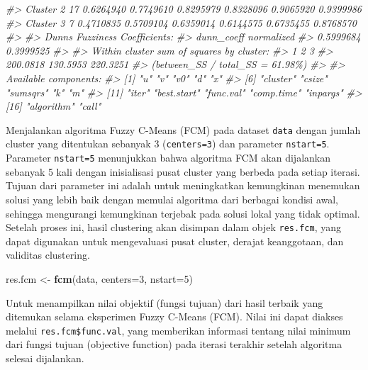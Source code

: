 \documentclass[
  oneside]{book}
\newenvironment{Shaded}{\begin{snugshade}}{\end{snugshade}}
\newcommand{\AttributeTok}[1]{\textcolor[rgb]{0.13,0.29,0.53}{#1}}
\newcommand{\CommentTok}[1]{\textcolor[rgb]{0.56,0.35,0.01}{\textit{#1}}}
\newcommand{\DecValTok}[1]{\textcolor[rgb]{0.00,0.00,0.81}{#1}}
\newcommand{\FunctionTok}[1]{\textcolor[rgb]{0.13,0.29,0.53}{\textbf{#1}}}
\newcommand{\NormalTok}[1]{#1}
\newcommand{\OtherTok}[1]{\textcolor[rgb]{0.56,0.35,0.01}{#1}}
\begin{document}
\begin{Shaded}
\begin{Highlighting}[]
\CommentTok{\#\textgreater{} Cluster 2   17 0.6264940 0.7749610 0.8295979 0.8328096 0.9065920 0.9399986}
\CommentTok{\#\textgreater{} Cluster 3    7 0.4710835 0.5709104 0.6359014 0.6144575 0.6735455 0.8768570}
\CommentTok{\#\textgreater{} }
\CommentTok{\#\textgreater{} Dunn\textquotesingle{}s Fuzziness Coefficients:}
\CommentTok{\#\textgreater{} dunn\_coeff normalized }
\CommentTok{\#\textgreater{}  0.5999684  0.3999525 }
\CommentTok{\#\textgreater{} }
\CommentTok{\#\textgreater{} Within cluster sum of squares by cluster:}
\CommentTok{\#\textgreater{}        1        2        3 }
\CommentTok{\#\textgreater{} 200.0818 130.5953 220.3251 }
\CommentTok{\#\textgreater{} (between\_SS / total\_SS =  61.98\%) }
\CommentTok{\#\textgreater{} }
\CommentTok{\#\textgreater{} Available components: }
\CommentTok{\#\textgreater{}  [1] "u"          "v"          "v0"         "d"          "x"         }
\CommentTok{\#\textgreater{}  [6] "cluster"    "csize"      "sumsqrs"    "k"          "m"         }
\CommentTok{\#\textgreater{} [11] "iter"       "best.start" "func.val"   "comp.time"  "inpargs"   }
\CommentTok{\#\textgreater{} [16] "algorithm"  "call"}
\end{Highlighting}
\end{Shaded}

Menjalankan algoritma Fuzzy C-Means (FCM) pada dataset \texttt{data} dengan jumlah cluster yang ditentukan sebanyak 3 (\texttt{centers=3}) dan parameter \texttt{nstart=5}. Parameter \texttt{nstart=5} menunjukkan bahwa algoritma FCM akan dijalankan sebanyak 5 kali dengan inisialisasi pusat cluster yang berbeda pada setiap iterasi. Tujuan dari parameter ini adalah untuk meningkatkan kemungkinan menemukan solusi yang lebih baik dengan memulai algoritma dari berbagai kondisi awal, sehingga mengurangi kemungkinan terjebak pada solusi lokal yang tidak optimal. Setelah proses ini, hasil clustering akan disimpan dalam objek \texttt{res.fcm}, yang dapat digunakan untuk mengevaluasi pusat cluster, derajat keanggotaan, dan validitas clustering.

\begin{Shaded}
\begin{Highlighting}[]
\NormalTok{res.fcm }\OtherTok{\textless{}{-}} \FunctionTok{fcm}\NormalTok{(data, }\AttributeTok{centers=}\DecValTok{3}\NormalTok{, }\AttributeTok{nstart=}\DecValTok{5}\NormalTok{)}
\end{Highlighting}
\end{Shaded}

Untuk menampilkan nilai objektif (fungsi tujuan) dari hasil terbaik yang ditemukan selama eksperimen Fuzzy C-Means (FCM). Nilai ini dapat diakses melalui \texttt{res.fcm\$func.val}, yang memberikan informasi tentang nilai minimum dari fungsi tujuan (objective function) pada iterasi terakhir setelah algoritma selesai dijalankan.
\end{document}
